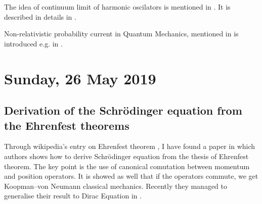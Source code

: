 \documentclass[main.tex]{subfiles}
\begin{document}
The idea of continuum limit of harmonic oscilators is mentioned in \cite[5.3]{lancaster-blundell2018}. It is described in details in \cite[see][6 Quantization of the Electromagnetic Field]{dauria-trigiante2012}.

Non-relativistic probability current in Quantum Mechanics, mentioned in \cite[6.2 Probability currents and densities]{lancaster-blundell2018} is introduced e.g. in \cite[3.6 Probability conservation]{desai2010}.

\section{Sunday, 26 May 2019}
\subsection{Derivation of the Schrödinger equation from the Ehrenfest theorems}
Through wikipedia's entry on Ehrenfest theorem \cite[see e.g.][3.7]{desai2010}, I have found a paper \cite{bondar2012} in which authors shows how to derive Schrödinger equation from the thesis of Ehrenfest theorem. The key point is the use of canonical comutation between momentum and position operators. It is showed as well that if the operators commute, we get Koopman–von Neumann classical mechanics. Recently they managed to generalise their result to Dirac Equation in \cite{cabrera2019}.
\end{document}

